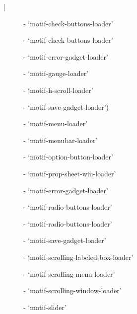 \begin{figure}
\bar{}
\begin{description}
\item[]  - `motif-check-buttons-loader'

\item[]  - `motif-check-buttons-loader'

\item[]  - `motif-error-gadget-loader'

\item[]  - `motif-gauge-loader'

\item[]  - `motif-h-scroll-loader'

\item[]  - `motif-save-gadget-loader')

\item[]  - `motif-menu-loader'

\item[]  - `motif-menubar-loader'

\item[]  - `motif-option-button-loader'

\item[]  - `motif-prop-sheet-win-loader'

\item[]  - `motif-error-gadget-loader'

\item[]  - `motif-radio-buttons-loader'

\item[]  - `motif-radio-buttons-loader'

\item[]  - `motif-save-gadget-loader'

\item[]  - `motif-scrolling-labeled-box-loader'

\item[]  - `motif-scrolling-menu-loader'

\item[]  - `motif-scrolling-window-loader'

\item[]  - `motif-slider'


\end{description}
\end{figure}
